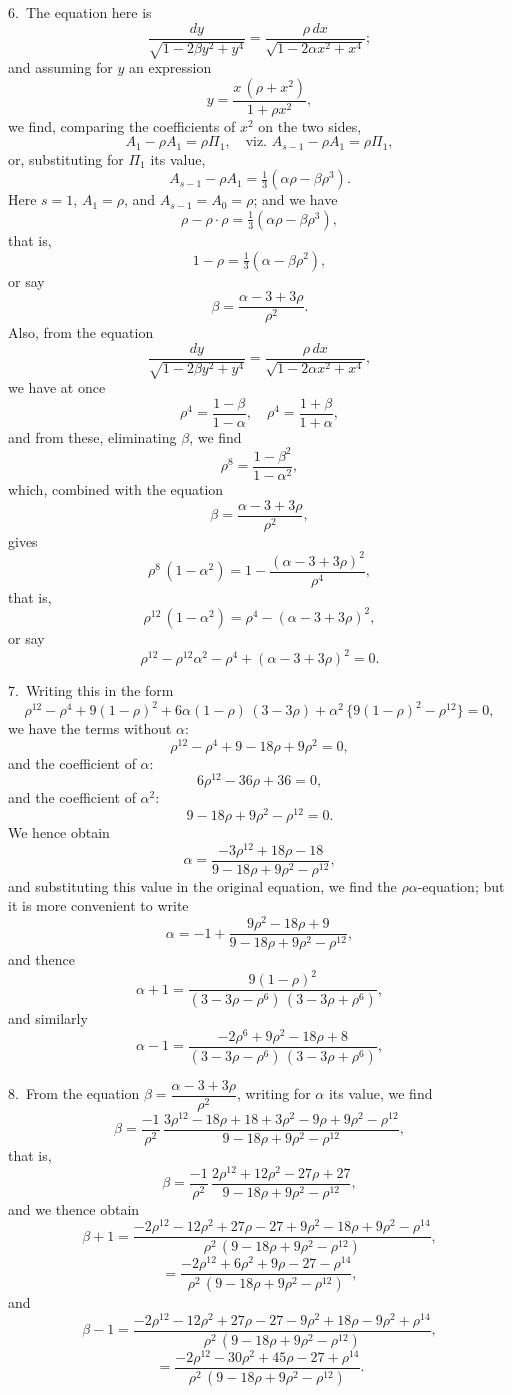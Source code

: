 \documentclass[11pt,a4paper]{book}
\begin{document}
6.\ The equation here is
\[
\frac{dy}{\sqrt{1 - 2\beta y^2 + y^4}}
= \frac{\rho\, dx}{\sqrt{1 - 2\alpha x^2 + x^4}};
\]
and assuming for $y$ an expression
\[
y = \frac{x\, (\rho + x^2)}{1 + \rho x^2},
\]
we find, comparing the coefficients of $x^2$ on the two sides,
\[
A_1 - \rho A_1 = \rho \Pi_1, \quad \text{viz. } A_{s-1} - \rho A_1 = \rho \Pi_1,
\]
or, substituting for $\Pi_1$ its value,
\[
A_{s-1} - \rho A_1 = \tfrac13(\alpha \rho - \beta \rho^3).
\]
Here $s = 1$, $A_1 = \rho$, and $A_{s-1} = A_0 = \rho$; and we have
\[
\rho - \rho \cdot \rho = \tfrac13(\alpha \rho - \beta \rho^3),
\]
that is,
\[
1 - \rho = \tfrac13(\alpha - \beta \rho^2),
\]
or say
\[
\beta = \frac{\alpha - 3 + 3\rho}{\rho^2}.
\]
Also, from the equation
\[
\frac{dy}{\sqrt{1 - 2\beta y^2 + y^4}}
= \frac{\rho\, dx}{\sqrt{1 - 2\alpha x^2 + x^4}},
\]
we have at once
\[
\rho^4 = \frac{1 - \beta}{1 - \alpha}, \quad \rho^4 = \frac{1 + \beta}{1 + \alpha},
\]
and from these, eliminating $\beta$, we find
\[
\rho^8 = \frac{1 - \beta^2}{1 - \alpha^2},
\]
which, combined with the equation
\[
\beta = \frac{\alpha - 3 + 3\rho}{\rho^2},
\]
gives
\[
\rho^8\, (1 - \alpha^2) = 1 - \frac{(\alpha - 3 + 3\rho)^2}{\rho^4},
\]
that is,
\[
\rho^{12}\, (1 - \alpha^2) = \rho^4 - (\alpha - 3 + 3\rho)^2,
\]
or say
\[
\rho^{12} - \rho^{12}\alpha^2 - \rho^4 + (\alpha - 3 + 3\rho)^2 = 0.
\]

7.\ Writing this in the form
\[
\rho^{12} - \rho^4 + 9(1 - \rho)^2 + 6\alpha(1 - \rho)\, (3 - 3\rho) + \alpha^2\, \{9(1 - \rho)^2 - \rho^{12}\} = 0,
\]
we have the terms without $\alpha$:
\[
\rho^{12} - \rho^4 + 9 - 18\rho + 9\rho^2 = 0,
\]
and the coefficient of $\alpha$:
\[
6\rho^{12} - 36\rho + 36 = 0,
\]
and the coefficient of $\alpha^2$:
\[
9 - 18\rho + 9\rho^2 - \rho^{12} = 0.
\]
We hence obtain
\[
\alpha = \frac{-3\rho^{12} + 18\rho - 18}{9 - 18\rho + 9\rho^2 - \rho^{12}},
\]
and substituting this value in the original equation, we find the $\rho\alpha$-equation; but
it is more convenient to write
\[
\alpha = -1 + \frac{9\rho^2 - 18\rho + 9}{9 - 18\rho + 9\rho^2 - \rho^{12}},
\]
and thence
\[
\alpha + 1 = \frac{9(1 - \rho)^2}{(3 - 3\rho - \rho^6)\, (3 - 3\rho + \rho^6)},
\]
and similarly
\[
\alpha - 1 = \frac{-2\rho^6 + 9\rho^2 - 18\rho + 8}{(3 - 3\rho - \rho^6)\, (3 - 3\rho + \rho^6)},
\]

8.\ From the equation $\beta = \dfrac{\alpha - 3 + 3\rho}{\rho^2}$, writing for $\alpha$ its value, we find
\[
\beta = \frac{-1}{\rho^2}\,
\frac{3\rho^{12} - 18\rho + 18 + 3\rho^2 - 9\rho + 9\rho^2 - \rho^{12}}{9 - 18\rho + 9\rho^2 - \rho^{12}},
\]
that is,
\[
\beta = \frac{-1}{\rho^2}\,
\frac{2\rho^{12} + 12\rho^2 - 27\rho + 27}{9 - 18\rho + 9\rho^2 - \rho^{12}},
\]
and we thence obtain
\[
\beta + 1 = \frac{-2\rho^{12} - 12\rho^2 + 27\rho - 27 + 9\rho^2 - 18\rho + 9\rho^2 - \rho^{14}}
{\rho^2\, (9 - 18\rho + 9\rho^2 - \rho^{12})},
\]
\[
= \frac{-2\rho^{12} + 6\rho^2 + 9\rho - 27 - \rho^{14}}
{\rho^2\, (9 - 18\rho + 9\rho^2 - \rho^{12})},
\]
and
\[
\beta - 1 = \frac{-2\rho^{12} - 12\rho^2 + 27\rho - 27 - 9\rho^2 + 18\rho - 9\rho^2 + \rho^{14}}
{\rho^2\, (9 - 18\rho + 9\rho^2 - \rho^{12})},
\]
\[
= \frac{-2\rho^{12} - 30\rho^2 + 45\rho - 27 + \rho^{14}}
{\rho^2\, (9 - 18\rho + 9\rho^2 - \rho^{12})}.
\]
\end{document}
